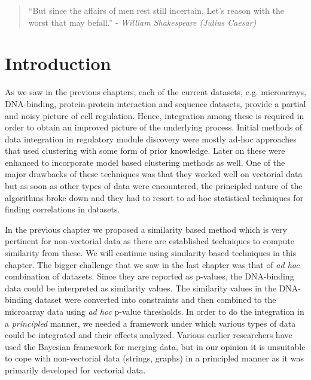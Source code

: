\begin{quote} ``But since the affairs of men rest still incertain, Let's reason with the worst that may befall.'' - \textit{William Shakespeare (Julius Caesar)}\end{quote} 
\section{Introduction}
As we saw in the previous chapters, each of the current datasets, e.g. microarrays, DNA-binding, protein-protein interaction and sequence datasets, provide a partial and noisy picture of cell regulation. Hence, integration among these is required in order to obtain an improved picture of the underlying process. Initial methods of data integration in regulatory module discovery were mostly ad-hoc approaches that used clustering with some form of prior knowledge. Later on these were enhanced to incorporate model based clustering methods as well. One of the major drawbacks of these techniques was that they worked well on vectorial data but as soon as other types of data were encountered, the principled nature of the algorithms broke down and they had to resort to ad-hoc statistical techniques for finding correlations in datasets.

In the previous chapter we proposed a similarity based method which is very pertinent for non-vectorial data as there are established techniques to compute similarity from these. We will continue using similarity based techniques in this chapter. The bigger challenge that we saw in the last chapter was that of \textit{ad hoc} combination of datasets. Since they are reported as p-values, the DNA-binding data could be interpreted as similarity values. The similarity values in the DNA-binding dataset were converted into constraints and then combined to the microarray data using \textit{ad hoc} p-value thresholds. In order to do the integration in a \textit{principled} manner, we needed a framework under which various types of data could be integrated and their effects analyzed. Various earlier researchers have used the Bayesian framework for merging data, but in our opinion it is unsuitable to cope with non-vectorial data (strings, graphs) in a principled manner as it was primarily developed for vectorial data. 

